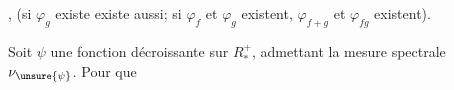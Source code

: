 , (si \(\varphi_g\) existe  existe aussi; si \(\varphi_f\) et \(\varphi_g\) existent, \(\varphi_{f+g}\) et \(\varphi_{fg}\) existent).

Soit \(\psi\) une fonction décroissante sur \(R_*^+\), admettant la mesure spectrale \(\nu_{\unsure{\psi}}\). Pour que

